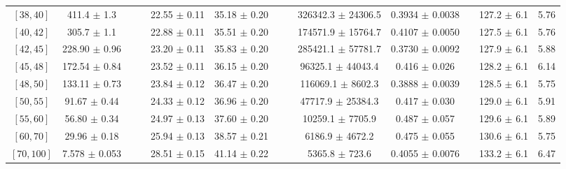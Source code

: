 \begin{tabular}{c||c|c|c|c|c|c|c|c|c|c|c||c}
$[38, 40]$ & 411.4 $\pm$ 1.3 &  &  & 22.55 $\pm$ 0.11 & 35.18 $\pm$ 0.20 &  &  & 326342.3 $\pm$ 24306.5 & 0.3934 $\pm$ 0.0038 &  & 127.2 $\pm$ 6.1 & 5.76\\
$[40, 42]$ & 305.7 $\pm$ 1.1 &  &  & 22.88 $\pm$ 0.11 & 35.51 $\pm$ 0.20 &  &  & 174571.9 $\pm$ 15764.7 & 0.4107 $\pm$ 0.0050 &  & 127.5 $\pm$ 6.1 & 5.76\\
$[42, 45]$ & 228.90 $\pm$ 0.96 &  &  & 23.20 $\pm$ 0.11 & 35.83 $\pm$ 0.20 &  &  & 285421.1 $\pm$ 57781.7 & 0.3730 $\pm$ 0.0092 &  & 127.9 $\pm$ 6.1 & 5.88\\
$[45, 48]$ & 172.54 $\pm$ 0.84 &  &  & 23.52 $\pm$ 0.11 & 36.15 $\pm$ 0.20 &  &  & 96325.1 $\pm$ 44043.4 & 0.416 $\pm$ 0.026 &  & 128.2 $\pm$ 6.1 & 6.14\\
$[48, 50]$ & 133.11 $\pm$ 0.73 &  &  & 23.84 $\pm$ 0.12 & 36.47 $\pm$ 0.20 &  &  & 116069.1 $\pm$ 8602.3 & 0.3888 $\pm$ 0.0039 &  & 128.5 $\pm$ 6.1 & 5.75\\
$[50, 55]$ & 91.67 $\pm$ 0.44 &  &  & 24.33 $\pm$ 0.12 & 36.96 $\pm$ 0.20 &  &  & 47717.9 $\pm$ 25384.3 & 0.417 $\pm$ 0.030 &  & 129.0 $\pm$ 6.1 & 5.91\\
$[55, 60]$ & 56.80 $\pm$ 0.34 &  &  & 24.97 $\pm$ 0.13 & 37.60 $\pm$ 0.20 &  &  & 10259.1 $\pm$ 7705.9 & 0.487 $\pm$ 0.057 &  & 129.6 $\pm$ 6.1 & 5.89\\
$[60, 70]$ & 29.96 $\pm$ 0.18 &  &  & 25.94 $\pm$ 0.13 & 38.57 $\pm$ 0.21 &  &  & 6186.9 $\pm$ 4672.2 & 0.475 $\pm$ 0.055 &  & 130.6 $\pm$ 6.1 & 5.75\\
$[70, 100]$ & 7.578 $\pm$ 0.053 &  &  & 28.51 $\pm$ 0.15 & 41.14 $\pm$ 0.22 &  &  & 5365.8 $\pm$ 723.6 & 0.4055 $\pm$ 0.0076 &  & 133.2 $\pm$ 6.1 & 6.47\\
\end{tabular}
